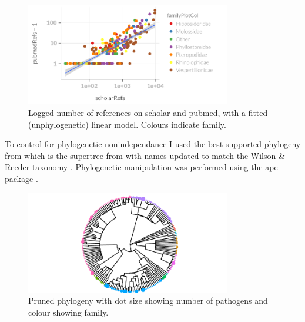 \begin{knitrout}\footnotesize
{}\color{fgcolor}\begin{figure}[t]

{\centering \includegraphics[width=0.8\textwidth]{figure/scholarvspubmed-1} 

}

\caption[Logged number of references on scholar and pubmed, with a fitted (unphylogenetic) linear model]{Logged number of references on scholar and pubmed, with a fitted (unphylogenetic) linear model. Colours indicate family.}\label{fig:scholarvspubmed}
\end{figure}


\end{knitrout}





To control for phylogenetic nonindependance I used the best-supported phylogeny from \cite{fritz2009geographical} which is the supertree from \cite{bininda2007delayed} with names updated to match the Wilson \& Reeder taxonomy \cite{wilson2005mammal}.
Phylogenetic manipulation was performed using the ape package \cite{ape}.




\begin{knitrout}\footnotesize
{}\color{fgcolor}\begin{figure}[t]

{\centering \includegraphics[width=0.8\textwidth]{figure/treePlot-1} 

}

\caption[Pruned phylogeny with dot size showing number of pathogens and colour showing family]{Pruned phylogeny with dot size showing number of pathogens and colour showing family.}\label{fig:treePlot}
\end{figure}


\end{knitrout}



